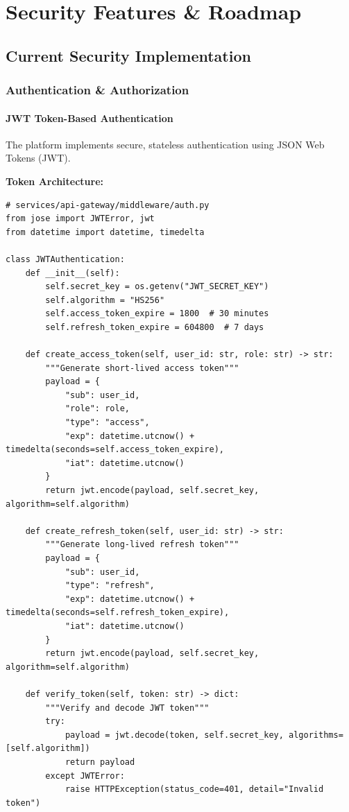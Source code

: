 
\chapter{Security Features \& Roadmap}

\section{Current Security Implementation}

\subsection{Authentication \& Authorization}

\subsubsection{JWT Token-Based Authentication}

The platform implements secure, stateless authentication using JSON Web Tokens (JWT).

\textbf{Token Architecture:}
\begin{lstlisting}[style=pythonstyle]
# services/api-gateway/middleware/auth.py
from jose import JWTError, jwt
from datetime import datetime, timedelta

class JWTAuthentication:
    def __init__(self):
        self.secret_key = os.getenv("JWT_SECRET_KEY")
        self.algorithm = "HS256"
        self.access_token_expire = 1800  # 30 minutes
        self.refresh_token_expire = 604800  # 7 days
    
    def create_access_token(self, user_id: str, role: str) -> str:
        """Generate short-lived access token"""
        payload = {
            "sub": user_id,
            "role": role,
            "type": "access",
            "exp": datetime.utcnow() + timedelta(seconds=self.access_token_expire),
            "iat": datetime.utcnow()
        }
        return jwt.encode(payload, self.secret_key, algorithm=self.algorithm)
    
    def create_refresh_token(self, user_id: str) -> str:
        """Generate long-lived refresh token"""
        payload = {
            "sub": user_id,
            "type": "refresh",
            "exp": datetime.utcnow() + timedelta(seconds=self.refresh_token_expire),
            "iat": datetime.utcnow()
        }
        return jwt.encode(payload, self.secret_key, algorithm=self.algorithm)
    
    def verify_token(self, token: str) -> dict:
        """Verify and decode JWT token"""
        try:
            payload = jwt.decode(token, self.secret_key, algorithms=[self.algorithm])
            return payload
        except JWTError:
            raise HTTPException(status_code=401, detail="Invalid token")
\end{lstlisting}

